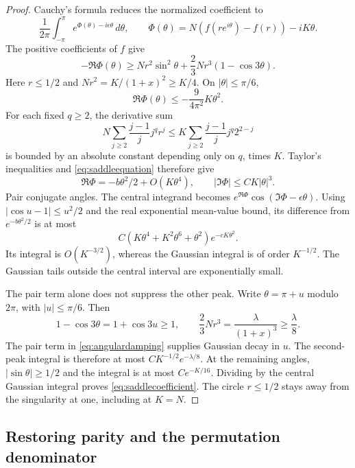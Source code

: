 \begin{proof}
Cauchy's formula reduces the normalized coefficient to
\[
\frac1{2\pi}\int_{-\pi}^{\pi}
e^{\Phi(\theta)-i\epsilon\theta}\,d\theta,
\qquad
\Phi(\theta)=N(f(re^{i\theta})-f(r))-iK\theta.
\]
The positive coefficients of $f$ give
\begin{equation}\label{eq:angulardamping}
-\Re\Phi(\theta)
\ge Nr^2\sin^2\theta+\frac23Nr^3(1-\cos3\theta).
\end{equation}
Here $r\le1/2$ and $Nr^2=K/(1+x)^2\ge K/4$. On $|\theta|\le\pi/6$,
\[
\Re\Phi(\theta)\le-\frac9{4\pi^2}K\theta^2.
\]
For each fixed $q\ge2$, the derivative sum
\[
N\sum_{j\ge2}\frac{j-1}{j}j^qr^j
\le K\sum_{j\ge2}\frac{j-1}{j}j^q2^{2-j}
\]
is bounded by an absolute constant depending only on $q$, times $K$. Taylor's inequalities and \eqref{eq:saddleequation} therefore give
\[
\Re\Phi=-b\theta^2/2+O(K\theta^4),\qquad
|\Im\Phi|\le CK|\theta|^3.
\]
Pair conjugate angles. The central integrand becomes
$e^{\Re\Phi}\cos(\Im\Phi-\epsilon\theta)$. Using
$|\cos u-1|\le u^2/2$ and the real exponential mean-value bound, its difference from $e^{-b\theta^2/2}$ is at most
\[
C(K\theta^4+K^2\theta^6+\theta^2)e^{-cK\theta^2}.
\]
Its integral is $O(K^{-3/2})$, whereas the Gaussian integral is of order $K^{-1/2}$. The Gaussian tails outside the central interval are exponentially small.

The pair term alone does not suppress the other peak. Write $\theta=\pi+u$ modulo $2\pi$, with $|u|\le\pi/6$. Then
\[
1-\cos3\theta=1+\cos3u\ge1,\qquad
\frac23Nr^3=\frac\lambda{(1+x)^3}\ge\frac\lambda8.
\]
The pair term in \eqref{eq:angulardamping} supplies Gaussian decay in $u$. The second-peak integral is therefore at most $CK^{-1/2}e^{-\lambda/8}$. At the remaining angles, $|\sin\theta|\ge1/2$ and the integral is at most $Ce^{-K/16}$. Dividing by the central Gaussian integral proves \eqref{eq:saddlecoefficient}. The circle $r\le1/2$ stays away from the singularity at one, including at $K=N$.
\end{proof}

\subsection{Restoring parity and the permutation denominator}

